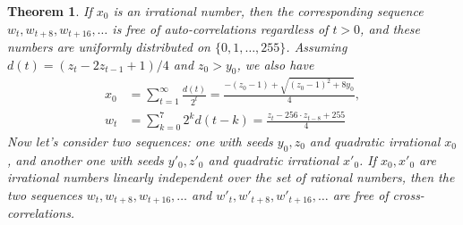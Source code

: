 \documentclass[oneside,10pt]{book}
\newtheorem{theorem}{Theorem}[section]
\begin{document}
\begin{theorem}\label{vgfd2}
If $x_0$ is an irrational number, then the corresponding sequence
 $w_t,w_{t+8}, w_{t+16},\dots$  is free of auto-correlations regardless of $t>0$, and these numbers
 are uniformly distributed on $\{0, 1,\dots, 255\}$.
Assuming $d(t) = (z_t - 2z_{t-1} + 1)/4$ and $z_0 > y_0$, we also have
\begin{align}
x_0 & = \sum_{t=1}^\infty \frac{d(t)}{2^t} = \frac{-(z_0 -1) + \sqrt{(z_0-1)^2+8y_0}}{4},  \label{popot2i}\\
w_t & = \sum_{k=0}^7 2^k d(t-k) =  \frac{z_t - 256\cdot z_{t-8} + 255}{4}  \label{popot2}
\end{align}
Now let's consider two sequences: one with seeds $y_0, z_0$ and quadratic irrational $x_0$, and another one with seeds $y'_0, z'_0$ and
quadratic irrational $x'_0$. If $x_0, x'_0$ are irrational numbers linearly independent over the set of rational numbers, then
 the two sequences $w_t,w_{t+8}, w_{t+16},\dots$ and $w'_t,w'_{t+8}, w'_{t+16},\dots$ are free of cross-correlations.


\end{theorem}
\end{document}
